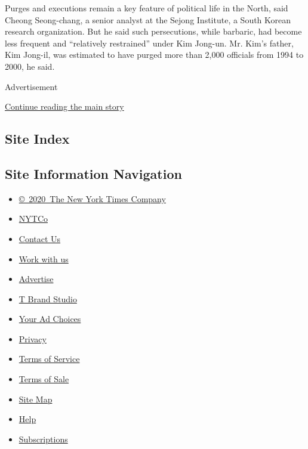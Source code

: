 Purges and executions remain a key feature of political life in the
North, said Cheong Seong-chang, a senior analyst at the Sejong
Institute, a South Korean research organization. But he said such
persecutions, while barbaric, had become less frequent and ``relatively
restrained'' under Kim Jong-un. Mr. Kim's father, Kim Jong-il, was
estimated to have purged more than 2,000 officials from 1994 to 2000, he
said.

Advertisement

\protect\hyperlink{after-bottom}{Continue reading the main story}

\hypertarget{site-index}{%
\subsection{Site Index}\label{site-index}}

\hypertarget{site-information-navigation}{%
\subsection{Site Information
Navigation}\label{site-information-navigation}}

\begin{itemize}
\tightlist
\item
  \href{https://help.nytimes.com/hc/en-us/articles/115014792127-Copyright-notice}{©~2020~The
  New York Times Company}
\end{itemize}

\begin{itemize}
\tightlist
\item
  \href{https://www.nytco.com/}{NYTCo}
\item
  \href{https://help.nytimes.com/hc/en-us/articles/115015385887-Contact-Us}{Contact
  Us}
\item
  \href{https://www.nytco.com/careers/}{Work with us}
\item
  \href{https://nytmediakit.com/}{Advertise}
\item
  \href{http://www.tbrandstudio.com/}{T Brand Studio}
\item
  \href{https://www.nytimes.com/privacy/cookie-policy\#how-do-i-manage-trackers}{Your
  Ad Choices}
\item
  \href{https://www.nytimes.com/privacy}{Privacy}
\item
  \href{https://help.nytimes.com/hc/en-us/articles/115014893428-Terms-of-service}{Terms
  of Service}
\item
  \href{https://help.nytimes.com/hc/en-us/articles/115014893968-Terms-of-sale}{Terms
  of Sale}
\item
  \href{https://spiderbites.nytimes.com}{Site Map}
\item
  \href{https://help.nytimes.com/hc/en-us}{Help}
\item
  \href{https://www.nytimes.com/subscription?campaignId=37WXW}{Subscriptions}
\end{itemize}
